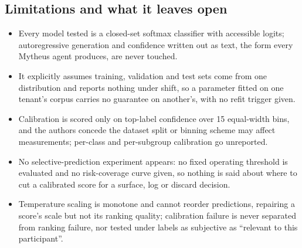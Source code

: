 \subsection{Limitations and what it leaves open}
\begin{itemize}[leftmargin=*, itemsep=1pt, topsep=2pt]
  \item Every model tested is a closed-set softmax classifier with accessible logits; autoregressive generation and confidence written out as text, the form every Mytheus agent produces, are never touched.
  \item It explicitly assumes training, validation and test sets come from one distribution and reports nothing under shift, so a parameter fitted on one tenant's corpus carries no guarantee on another's, with no refit trigger given.
  \item Calibration is scored only on top-label confidence over 15 equal-width bins, and the authors concede the dataset split or binning scheme may affect measurements; per-class and per-subgroup calibration go unreported.
  \item No selective-prediction experiment appears: no fixed operating threshold is evaluated and no risk-coverage curve given, so nothing is said about where to cut a calibrated score for a surface, log or discard decision.
  \item Temperature scaling is monotone and cannot reorder predictions, repairing a score's scale but not its ranking quality; calibration failure is never separated from ranking failure, nor tested under labels as subjective as ``relevant to this participant''.
\end{itemize}
